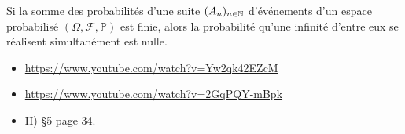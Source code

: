 \begin{tcolorbox}
    Si la somme des probabilités d'une suite $(A_n)_{n \in \mathbb{N}}$ d'événements d'un espace probabilisé $(\Omega, \mathscr{F}, \mathbb{P})$ est finie, alors la probabilité qu'une infinité d'entre eux se réalisent simultanément est nulle.
\end{tcolorbox}

\begin{itemize}
    \item \url{https://www.youtube.com/watch?v=Yw2qk42EZcM}
    \item \url{https://www.youtube.com/watch?v=2GqPQY-mBpk}
    \item \cite{intro_graph_alea} II) §5 page 34.
\end{itemize}